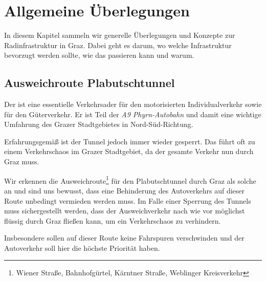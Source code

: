 \chapter{Allgemeine Überlegungen}
In diesem Kapitel sammeln wir generelle Überlegungen und Konzepte zur Radinfrastruktur in Graz. Dabei geht es darum, wo welche Infrastruktur bevorzugt werden sollte, wie das passieren kann und warum.

\section{Ausweichroute Plabutschtunnel}
Der  ist eine essentielle Verkehrsader für den motorisierten Individualverkehr sowie für den Güterverkehr. Er ist Teil der \emph{A9 Phyrn-Autobahn} und damit eine wichtige Umfahrung des Grazer Stadtgebietes in Nord-Süd-Richtung.

Erfahrungsgemäß ist der Tunnel jedoch immer wieder gesperrt. Das führt oft zu einem Verkehrschaos im Grazer Stadtgebiet, da der gesamte Verkehr nun durch Graz muss.

Wir erkennen die \glqq{}Ausweichroute\grqq{}\footnote{Wiener Straße, Bahnhofgürtel, Kärntner Straße, Weblinger Kreisverkehr} für den Plabutschtunnel durch Graz als solche an und sind uns bewusst, dass eine Behinderung des Autoverkehrs auf dieser Route unbedingt vermieden werden muss. Im Falle einer Sperrung des Tunnels muss sichergestellt werden, dass der Ausweichverkehr nach wie vor möglichst flüssig durch Graz fließen kann, um ein Verkehrschaos zu verhindern.

Insbesondere sollen auf dieser Route keine Fahrspuren verschwinden und der Autoverkehr soll hier die höchste Priorität haben.